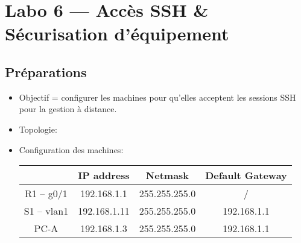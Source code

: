\documentclass[a4paper]{article}
\begin{document}
\section{Labo 6 --- Accès SSH \& Sécurisation d'équipement}










\subsection{Préparations}





\begin{itemize}





\item Objectif = configurer les machines pour qu'elles acceptent les sessions SSH pour la gestion à distance.





\item Topologie:
\begin{center}
\end{center}





\item Configuration des machines:
\begin{center}
    \begin{tabular}{|c|c|c|c|} \hline
        & IP address & Netmask & Default Gateway \\ \hline
        R1 -- g0/1 & 192.168.1.1 & 255.255.255.0 & / \\ \hline
        S1 -- vlan1 & 192.168.1.11 & 255.255.255.0 & 192.168.1.1 \\ \hline
        PC-A & 192.168.1.3 & 255.255.255.0 & 192.168.1.1 \\ \hline
    \end{tabular}
\end{center}





\end{itemize}
\end{document}
